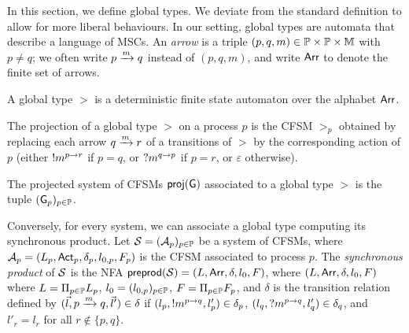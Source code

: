 


In this section, we define global types. We deviate from the standard definition to allow for more liberal behaviours. In our setting, global types are automata that describe a language of MSCs. 
An \emph{arrow} is a triple $(p,q,m)\in\Procs\times\Procs\times\Messages$ with $p\neq q$;
we often write $\marrow{p}{q}{m}$ instead of $(p,q,m)$, and write $\labelalphabet$
to denote the finite set of arrows.

\begin{definition}
    A global type $\gt$ is a deterministic finite state automaton over the alphabet $\labelalphabet$.
\end{definition}




The projection of a global type $\gt$ on a process $p$ is the CFSM $\gt_p$ obtained by 
replacing each arrow $\marrow{q}{r}{\msg}$ of a transitions
of $\gt$ by the corresponding action of $p$ (either $\send{p}{r}{\msg}$ if $p=q$, or $\recv{q}{p}{\msg}$ if $p=r$, 
or $\varepsilon$ otherwise).

\begin{definition}\label{def:projected-system}
    The projected system of CFSMs $\projectionof{\gt}$ 
    associated to a global type $\gt$ is the tuple $(\gt_p)_{p\in\Procs}$.
\end{definition}


Conversely, for every system, we can associate a global type computing its synchronous product. 
Let $\cfsms=(\mathcal A_p)_{p\in\Procs}$ be a system of CFSMs, where 
$\mathcal A_p=(L_p,\Actp,\delta_p,l_{0,p},F_p)$ is the CFSM associated to process $p$.
The \emph{synchronous product} of $\cfsms$ is the NFA $\preproductof{\cfsms}=(L,\labelalphabet,\delta,l_{0},F)$, where
$(L,\labelalphabet,\delta,l_{0},F)$ where $L=\Pi_{p\in\Procs}L_p$, 
$l_0=(l_{0,p})_{p\in\Procs}$, $F=\Pi_{p\in\Procs}F_p$, and
$\delta$ is the transition relation defined by
$(\vec l,\marrow{p}{q}{m},\vec l')\in\delta$ if
$(l_p,\send{p}{q}{m},l'_p)\in\delta_p$,
$(l_q,\recv{p}{q}{m},l'_q)\in\delta_q$,
and $l'_r=l_r$ for all $r\not\in\{p,q\}$. 


